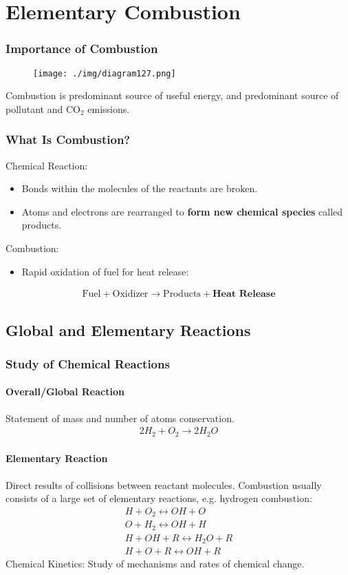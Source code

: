\chapter{Elementary Combustion}
\subsection*{Importance of Combustion}
\begin{figure}[H]
  \centering
  \texttt{[image: ./img/diagram127.png]}
  \caption{}
\end{figure}
Combustion is predominant source of useful energy, and predominant source of pollutant and CO$_2$ emissions.
\subsection*{What Is Combustion?}
Chemical Reaction:
\begin{itemize}[noitemsep]
  \item Bonds within the molecules of the reactants are broken.
  \item Atoms and electrons are rearranged to \textbf{form new chemical species} called products.
\end{itemize}
Combustion:
\begin{itemize}[noitemsep]
  \item Rapid oxidation of fuel for heat release:
\end{itemize}
\begin{gather}
  \text{Fuel} + \text{Oxidizer} \longrightarrow \text{Products} + \textbf{Heat Release}
\end{gather}
\section{Global and Elementary Reactions}
\subsection{Study of Chemical Reactions}
\subsubsection{Overall/Global Reaction}
Statement of mass and number of atoms conservation.
\begin{gather}
  2H_2 + O_2 \longrightarrow 2H_2O
\end{gather}
\subsubsection{Elementary Reaction}
Direct results of collisions between reactant molecules. Combustion usually consists of a large set of elementary reactions, e.g. hydrogen combustion:
\begin{gather}
  H + O_2 \longleftrightarrow OH + O \\[5pt]
  O + H_2 \longleftrightarrow OH + H \\[5pt]
  H + OH + R \longleftrightarrow H_2O + R \\[5pt]
  H + O + R \longleftrightarrow OH + R
\end{gather}
Chemical Kinetics: Study of mechanisms and rates of chemical change.

